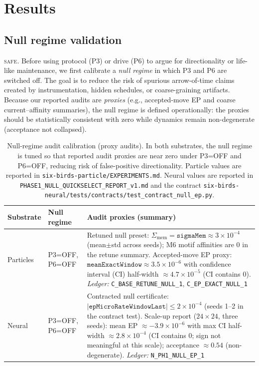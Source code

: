 \documentclass[11pt]{article}
\newcommand{\SAFE}{\textsc{safe}}
\begin{document}
\section{Results}\label{sec:results}
\subsection{Null regime validation}\label{sec:results:null}
\SAFE. Before using protocol (P3) or drive (P6) to argue for directionality or life-like maintenance, we first calibrate a \emph{null regime} in which P3 and P6 are switched off. The goal is to reduce the risk of spurious arrow-of-time claims created by instrumentation, hidden schedules, or coarse-graining artifacts. Because our reported audits are \emph{proxies} (e.g., accepted-move EP and coarse current--affinity summaries), the null regime is defined operationally: the proxies should be statistically consistent with zero while dynamics remain non-degenerate (acceptance not collapsed).

\begin{table}[t]
\centering
\small
\begin{tabularx}{\textwidth}{@{}l l X@{}}
\toprule
Substrate & Null regime & Audit proxies (summary) \\
\midrule
Particles & P3=OFF, P6=OFF &
Retuned null preset: $\Sigma_{\mathrm{mem}}=\texttt{sigmaMem}\approx 3\times 10^{-4}$ (mean$\pm$std across seeds); M6 motif affinities are $0$ in the retune summary. Accepted-move EP proxy: $\texttt{meanExactWindow} \approx 3.5\times 10^{-6}$ with confidence interval (CI) half-width $\approx 4.7\times 10^{-5}$ (CI contains $0$). \newline
\textit{Ledger:} \texttt{C\_BASE\_RETUNE\_NULL\_1}, \texttt{C\_EP\_EXACT\_NULL\_1} \\
\addlinespace
Neural & P3=OFF, P6=OFF &
Contracted null certificate: $|\texttt{epMicroRateWindowLast}|\le 2\times 10^{-4}$ (seeds 1--2 in the contract test). Scale-up report ($24{\times}24$, three seeds): mean EP $\approx -3.9\times 10^{-6}$ with max CI half-width $\approx 2.8\times 10^{-4}$ (CI contains $0$; sign not meaningful at this scale); acceptance $\approx 0.54$ (non-degenerate). \newline
\textit{Ledger:} \texttt{N\_PH1\_NULL\_EP\_1} \\
\bottomrule
\end{tabularx}
\caption{Null-regime audit calibration (proxy audits). In both substrates, the null regime is tuned so that reported audit proxies are near zero under P3=OFF and P6=OFF, reducing risk of false-positive directionality. Particle values are reported in \texttt{six-birds-particle/EXPERIMENTS.md}. Neural values are reported in \texttt{PHASE1\_NULL\_QUICKSELECT\_REPORT\_v1.md} and the contract \texttt{six-birds-neural/tests/contracts/test\_contract\_null\_ep.py}.}
\label{tab:null_audit}
\end{table}
\end{document}
